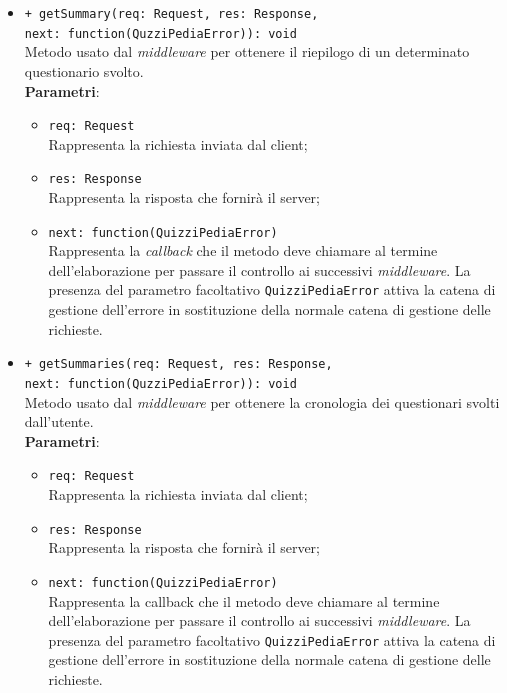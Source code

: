 \begin{itemize}
\begin{itemize}
\begin{itemize}
		 \end{itemize}
		   \item
		 \texttt{+ getSummary(req: Request, res: Response, \\next: function(QuzziPediaError)): void} \\
		Metodo usato dal \textit{middleware} per ottenere il riepilogo di un determinato questionario svolto. \\
		\textbf{Parametri}:
		 \begin{itemize}
		  \item
			\texttt{req: Request} \\
			Rappresenta la richiesta inviata dal client;
		  \item
			\texttt{res: Response} \\
			Rappresenta la risposta che fornirà il server;
		  \item
		    \texttt{next: function(QuizziPediaError)} \\
			Rappresenta la \textit{callback} che il metodo deve chiamare al termine dell'elaborazione per passare il controllo ai successivi \textit{middleware}. La presenza del parametro facoltativo \texttt{QuizziPediaError} attiva la catena di gestione dell'errore in sostituzione della normale catena di gestione delle richieste.
		 \end{itemize}
		 \item
		  \texttt{+ getSummaries(req: Request, res: Response, \\next: function(QuzziPediaError)): void} \\
		Metodo usato dal \textit{middleware} per ottenere la cronologia dei questionari svolti dall'utente. \\
		\textbf{Parametri}:
		 \begin{itemize}
		  \item
			\texttt{req: Request} \\
			Rappresenta la richiesta inviata dal client;
		  \item
			\texttt{res: Response} \\
			Rappresenta la risposta che fornirà il server;
		  \item
		    \texttt{next: function(QuizziPediaError)} \\
			Rappresenta la callback che il metodo deve chiamare al termine dell'elaborazione per passare il controllo ai successivi \textit{middleware}. La presenza del parametro facoltativo \texttt{QuizziPediaError} attiva la catena di gestione dell'errore in sostituzione della normale catena di gestione delle richieste.

\end{itemize}
\end{itemize}
\end{itemize}
